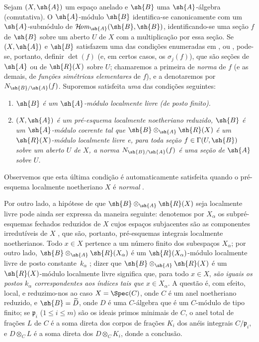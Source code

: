 \documentclass[oneside,10pt]{amsart}
\renewcommand{\leq}{\leqslant}
\def\shHom{\mathcal{H}\!\mathit{om}}
\newcommand{\oldpage}[2][]{\marginnote{\normalfont\footnotesize\textbf{#1}~|~#2}\ignorespaces}
\let\EGAOriginalLabel\label
\renewcommand{\label}[1]{\phantomsection\EGAOriginalLabel{#1}}
\begin{document}
\begin{env}[6.5.1]
\label{II.6.5.1}
Sejam $(X,\sh{A})$ um espaço anelado e $\sh{B}$ uma $\sh{A}$-álgebra (comutativa).
O $\sh{A}$-módulo $\sh{B}$ identifica-se canonicamente com um $\sh{A}$-submódulo de $\shHom_{\sh{A}}(\sh{B},\sh{B})$, identificando-se uma seção $f$ de $\sh{B}$ sobre um aberto $U$ de $X$ com a multiplicação por essa seção.
Se $(X,\sh{A})$ e $\sh{B}$ satisfazem uma das condições enumeradas em ,  ou , pode-se, portanto, definir $\det(f)$ (e, em certos casos, os $\sigma_j(f)$), que são seções de $\sh{A}$ ou de $\sh{R}(X)$ sobre $U$; chamaremos a primeira de \emph{norma} de $f$ (e as demais, de \emph{funções simétricas elementares} de $f$), e a denotaremos por $N_{\sh{B}/\sh{A}}(f)$.
Suporemos satisfeita \emph{uma} das condições seguintes:
\begin{enumerate}
  \item[{\rm(I)}] \emph{$\sh{B}$ é um $\sh{A}$-módulo localmente livre (de posto finito).}
  \item[{\rm(II)}] \emph{$(X,\sh{A})$ é um pré-esquema localmente noetheriano reduzido, $\sh{B}$ é um $\sh{A}$-módulo coerente tal que $\sh{B}\otimes_{\sh{A}}\sh{R}(X)$ é um $\sh{R}(X)$-módulo localmente livre e, para toda seção $f\in\Gamma(U,\sh{B})$ sobre um aberto $U$ de $X$, a norma $N_{\sh{B}/\sh{A}}(f)$ é uma seção de $\sh{A}$ sobre $U$.}
\end{enumerate}
\oldpage[II]{126}
Observemos que esta última condição é automaticamente satisfeita quando o pré-esquema localmente noetheriano $X$ é \emph{normal} .

Por outro lado, a hipótese de que $\sh{B}\otimes_{\sh{A}}\sh{R}(X)$ seja localmente livre pode ainda ser expressa da maneira seguinte: denotemos por $X_\alpha$ os subpré-esquemas fechados reduzidos de $X$ cujos espaços subjacentes são as componentes irredutíveis de $X$ , que são, portanto, pré-esquemas integrais localmente noetherianos.
Todo $x\in X$ pertence a um número finito dos subespaços $X_\alpha$;
por outro lado, $\sh{B}\otimes_{\sh{A}}\sh{R}(X_\alpha)$ é um $\sh{R}(X_\alpha)$-módulo localmente livre de posto constante~$k_\alpha$ ;
dizer que $\sh{B}\otimes_{\sh{A}}\sh{R}(X)$ é um $\sh{R}(X)$-módulo localmente livre significa que, para todo $x\in X$, \emph{são iguais os postos $k_\alpha$ correspondentes aos índices tais que $x\in X_\alpha$}.
A questão é, com efeito, local, e reduzimo-nos ao caso $X=\Spec(C)$, onde $C$ é um anel noetheriano reduzido, e $\sh{B}=\widetilde{D}$, onde $D$ é uma $C$-álgebra que é um $C$-módulo de tipo finito;
se $\mathfrak{p}_i$ ($1\leq i\leq m$) são os ideais primos minimais de $C$, o anel total de frações $L$ de $C$ é a soma direta dos corpos de frações $K_i$ dos anéis integrais $C/\mathfrak{p}_i$, e $D\otimes_C L$ é a soma direta dos $D\otimes_C K_i$, donde a conclusão.


\end{env}
\end{document}
